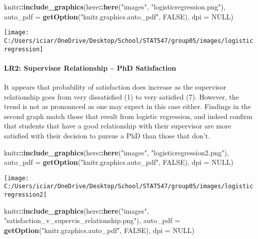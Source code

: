 \documentclass[
]{article}
\newenvironment{Shaded}{\begin{snugshade}}{\end{snugshade}}
\newcommand{\DataTypeTok}[1]{\textcolor[rgb]{0.13,0.29,0.53}{#1}}
\newcommand{\KeywordTok}[1]{\textcolor[rgb]{0.13,0.29,0.53}{\textbf{#1}}}
\newcommand{\NormalTok}[1]{#1}
\newcommand{\OperatorTok}[1]{\textcolor[rgb]{0.81,0.36,0.00}{\textbf{#1}}}
\newcommand{\OtherTok}[1]{\textcolor[rgb]{0.56,0.35,0.01}{#1}}
\newcommand{\StringTok}[1]{\textcolor[rgb]{0.31,0.60,0.02}{#1}}
\begin{document}
\begin{Shaded}
\begin{Highlighting}[]
\NormalTok{knitr}\OperatorTok{::}\KeywordTok{include_graphics}\NormalTok{(here}\OperatorTok{::}\KeywordTok{here}\NormalTok{(}\StringTok{"images"}\NormalTok{, }\StringTok{"logisticregression.png"}\NormalTok{), }\DataTypeTok{auto_pdf =} \KeywordTok{getOption}\NormalTok{(}\StringTok{"knitr.graphics.auto_pdf"}\NormalTok{, }\OtherTok{FALSE}\NormalTok{), }
    \DataTypeTok{dpi =} \OtherTok{NULL}\NormalTok{)}
\end{Highlighting}
\end{Shaded}

\texttt{[image: C:/Users/iciar/OneDrive/Desktop/School/STAT547/group05/images/logisticregression]}

\hypertarget{lr2-supervisor-relationship-phd-satisfaction}{%
\paragraph{LR2: Supervisor Relationship \textasciitilde{} PhD
Satisfaction}\label{lr2-supervisor-relationship-phd-satisfaction}}

It appears that probability of satisfaction does increase as the
supervisor relationship goes from very dissatisfied (1) to very
satisfied (7). However, the trend is not as pronounced as one may expect
in this case either. Findings in the second graph match those that
result from logistic regression, and indeed confirm that students that
have a good relationship with their supervisor are more satisfied with
their decision to pursue a PhD than those that don't.

\begin{Shaded}
\begin{Highlighting}[]
\NormalTok{knitr}\OperatorTok{::}\KeywordTok{include_graphics}\NormalTok{(here}\OperatorTok{::}\KeywordTok{here}\NormalTok{(}\StringTok{"images"}\NormalTok{, }\StringTok{"logisticregression2.png"}\NormalTok{), }\DataTypeTok{auto_pdf =} \KeywordTok{getOption}\NormalTok{(}\StringTok{"knitr.graphics.auto_pdf"}\NormalTok{, }\OtherTok{FALSE}\NormalTok{), }
    \DataTypeTok{dpi =} \OtherTok{NULL}\NormalTok{)}
\end{Highlighting}
\end{Shaded}

\texttt{[image: C:/Users/iciar/OneDrive/Desktop/School/STAT547/group05/images/logisticregression2]}

\begin{Shaded}
\begin{Highlighting}[]
\NormalTok{knitr}\OperatorTok{::}\KeywordTok{include_graphics}\NormalTok{(here}\OperatorTok{::}\KeywordTok{here}\NormalTok{(}\StringTok{"images"}\NormalTok{, }\StringTok{"satisfaction_v_supervis_relationship.png"}\NormalTok{), }\DataTypeTok{auto_pdf =} \KeywordTok{getOption}\NormalTok{(}\StringTok{"knitr.graphics.auto_pdf"}\NormalTok{, }\OtherTok{FALSE}\NormalTok{), }
    \DataTypeTok{dpi =} \OtherTok{NULL}\NormalTok{)}
\end{Highlighting}
\end{Shaded}
\end{document}
